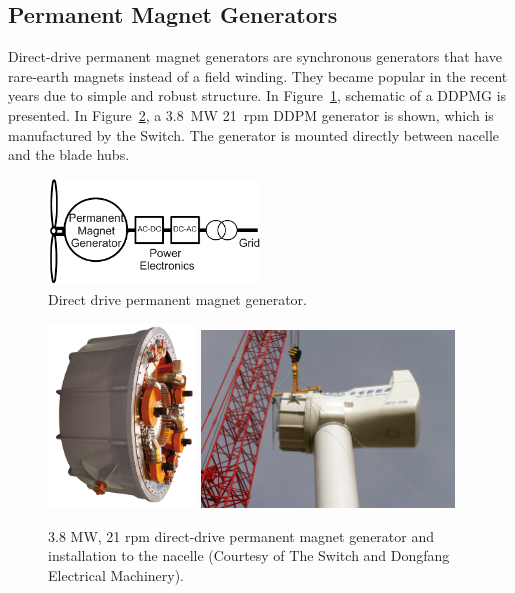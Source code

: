 \documentclass[a4paper, 11pt]{article} %
\begin{document}
\subsection{Permanent Magnet Generators}

Direct-drive permanent magnet generators are synchronous generators that have rare-earth magnets instead of a field winding. They became popular in the recent years due to simple and robust structure. In Figure~\ref{ddpmg}, schematic of a DDPMG is presented. In Figure~\ref{switch}, a 3.8~MW 21~rpm DDPM generator is shown, which is manufactured by the Switch. The generator is mounted directly between nacelle and the blade hubs.

\begin{figure}[h]
    \centering
    \includegraphics[width=0.5\textwidth]{DDPMG}
    \caption{Direct drive permanent magnet generator.} 
    \label{ddpmg}
\end{figure}


  \begin{figure}
    \centering
    \includegraphics[width=0.35\textwidth]{switch}
    \hfill
    \includegraphics[width=0.6\textwidth]{switch_turbine}
    \caption{3.8 MW, 21 rpm direct-drive permanent magnet generator and installation to the nacelle (Courtesy of The Switch and Dongfang Electrical Machinery).} 
    \label{switch}
  \end{figure}
\end{document}
